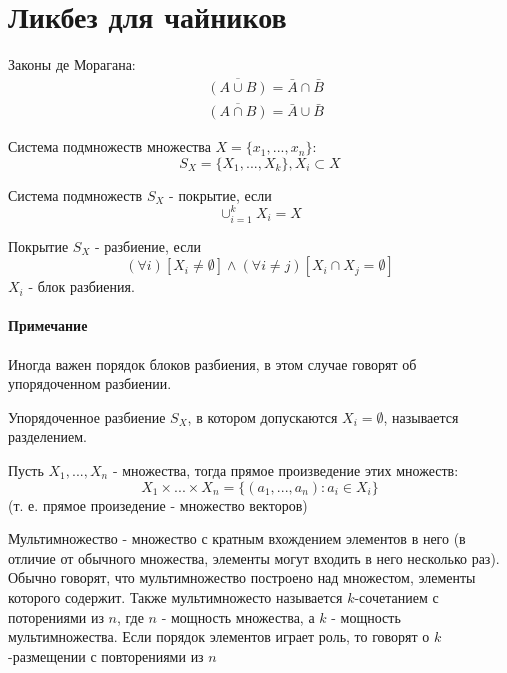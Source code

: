 \section{Ликбез для чайников}

\begin{Def}
	Законы де Морагана:
	\[
		\begin{split}
			& \overline{\left( A \cup B \right)} = \bar A \cap \bar B \\
			& \overline{\left( A \cap B \right)} = \bar A \cup \bar B
		\end{split}
	\] 
\end{Def}

\begin{Def}
	Система подмножеств множества $X = \{x_1, ... , x_n\}$:
	\[
		S_X = \{ X_1, ... , X_k\}, X_i \subset X
	\]
\end{Def}

\begin{Def}
	Система подмножеств $S_X$ - покрытие, если \[ \cup_{i=1}^k X_i = X \]
\end{Def}

\begin{Def}
	Покрытие $S_X$ - разбиение, если \[ \left(\forall i \right) \left[ X_i \not= \emptyset \right] \land \left( \forall i \not= j \right) \left[ X_i \cap X_j = \emptyset \right] \]
	$X_i$ - блок разбиения.
\end{Def}

\paragraph{Примечание}

Иногда важен порядок блоков разбиения, в этом случае говорят об упорядоченном разбиении.

\begin{Def}
	Упорядоченное разбиение $S_X$, в котором допускаются $X_i = \emptyset$, называется разделением.
\end{Def}

\begin{Def}
	Пусть $X_1, ... , X_n$ - множества, тогда прямое произведение этих множеств:
	\[
		X_1 \times ... \times X_n = \{\left( a_1, ... , a_n \right) : a_i \in X_i \}
	\]
	(т. е. прямое произедение - множество векторов)
\end{Def}

\begin{Def}
	Мультимножество - множество с кратным вхождением элементов в него (в отличие от обычного множества, элементы могут входить в него несколько раз).
	Обычно говорят, что мультимножество построено над множестом, элементы которого содержит.
	Также мультимножесто называется $k$-сочетанием с поторениями из $n$, где $n$ - мощность множества, а $k$ - мощность мультимножества.
	Если порядок элементов играет роль, то говорят о $k$-размещении с повторениями из $n$
\end{Def}

